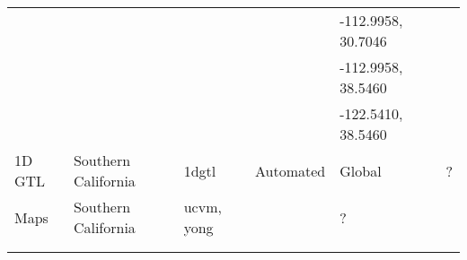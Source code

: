 \begin{table*}[t]
\begin{tabular}[]{lllllp{1.25in}}
                   &                       &               &              & -112.9958, 30.7046 &                              \\
                   &                       &               &              & -112.9958, 38.5460 &                              \\
                   &                       &               &              & -122.5410, 38.5460 &                              \\
1D GTL             & Southern California   & 1dgtl         &  Automated   & Global             & ?                            \\
\hline
\vsthirty{} Maps   & Southern California   & ucvm, yong    &              & ?                  & \citet{Wills_2006_BSSA}      \\
                   &                       &               &              &                    & \citet{Wald_2007_BSSA}       \\
                   &                       &               &              &                    & \citet{Yong_2012_BSSA}       \\
\hline
\end{tabular}
\label{tab:cvms}
\end{table*}


